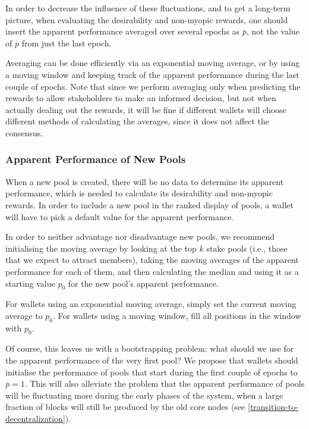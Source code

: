 \documentclass[11pt,a4paper]{article}
\newcommand\pbar{\overline{p}}
\begin{document}
In order to decrease the influence of these fluctuations, and to get a long-term
picture, when evaluating the desirability and non-myopic rewards, one should
insert the apparent performance averaged over several epochs as \(\pbar\), not
the value of \(\pbar\) from just the last epoch.

Averaging can be done efficiently via an exponential moving average, or by using
a moving window and keeping track of the apparent performance during the last
couple of epochs. Note that since we perform averaging only when predicting the
rewards to allow stakeholders to make an informed decision, but not when
actually dealing out the rewards, it will be fine if different wallets will
choose different methods of calculating the averages, since it does not affect
the consensus.

\subsubsection{Apparent Performance of New Pools}
\label{apparent-performance-of-new-pools}

When a new pool is created, there will be no data to determine its apparent
performance, which is needed to calculate its desirability and non-myopic
rewards. In order to include a new pool in the ranked display of pools, a wallet
will have to pick a default value for the apparent performance.

In order to neither advantage nor disadvantage new pools, we recommend
initialising the moving average by looking at the top \(k\) stake pools (i.e.,
those that we expect to attract members), taking the moving averages of the
apparent performance for each of them, and then calculating the median and
using it as a starting value \(p_0\) for the new pool's apparent performance.

For wallets using an exponential moving average, simply set the current moving
average to \(p_0\). For wallets using a moving window, fill all positions in the
window with \(p_0\).

Of course, this leaves us with a bootstrapping problem: what should we use for
the apparent performance of the very first pool? We propose that wallets should
initialise the performance of pools that start during the first couple of epochs
to \(\pbar=1\). This will also alleviate the problem that the apparent
performance of pools will be fluctuating more during the early phases of the
system, when a large fraction of blocks will still be produced by the old core
nodes (see \cref{transition-to-decentralization}).
\end{document}
